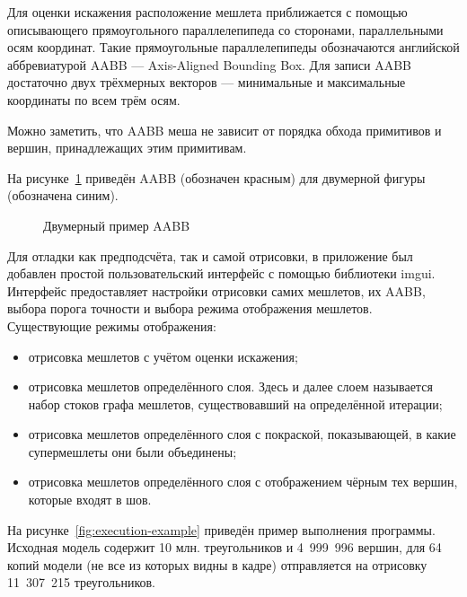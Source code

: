 Для оценки искажения расположение мешлета приближается с помощью описывающего прямоугольного параллелепипеда со сторонами, параллельными осям координат.
Такие прямоугольные параллелепипеды обозначаются английской аббревиатурой AABB --- Axis-Aligned Bounding Box.
Для записи AABB достаточно двух трёхмерных векторов --- минимальные и максимальные координаты по всем трём осям.

Можно заметить, что AABB меша не зависит от порядка обхода примитивов и вершин, принадлежащих этим примитивам.

На рисунке~\ref{fig:AABB} приведён AABB (обозначен красным) для двумерной фигуры (обозначена синим).

\begin{figure}[ht]
    \centering
    \caption{Двумерный пример AABB}
    \label{fig:AABB}
\end{figure}

Для отладки как предподсчёта, так и самой отрисовки, в приложение был добавлен простой пользовательский интерфейс с помощью библиотеки imgui.
Интерфейс предоставляет настройки отрисовки самих мешлетов, их AABB, выбора порога точности и выбора режима отображения мешлетов.
Существующие режимы отображения:
\begin{itemize}
    \item отрисовка мешлетов с учётом оценки искажения;
    \item отрисовка мешлетов определённого слоя.
    Здесь и далее слоем называется набор стоков графа мешлетов, существовавший на определённой итерации;
    \item отрисовка мешлетов определённого слоя с покраской, показывающей, в какие супермешлеты они были объединены;
    \item отрисовка мешлетов определённого слоя с отображением чёрным тех вершин, которые входят в шов.
\end{itemize}

На рисунке~\ref{fig:execution-example} приведён пример выполнения программы.
Исходная модель содержит 10 млн. треугольников и 4~999~996 вершин, для 64 копий модели (не все из которых видны в кадре) отправляется на отрисовку 11~307~215 треугольников.

